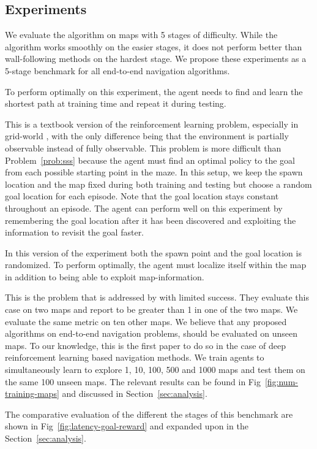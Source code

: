 \subsection{Experiments}
\label{sec:navtasks}
We evaluate the \NavAiiiCDiDiiL{} algorithm on maps with 5 stages of difficulty. While the algorithm works smoothly on the easier stages, it does not perform better than wall-following  methods on the hardest stage.
We propose these experiments as a 5-stage benchmark for all end-to-end navigation algorithms.

\begin{description}
  \label{prob:sss}
  To perform optimally on this experiment, the agent needs to find and learn the shortest path at training time and repeat it during testing. 

  This is a textbook version of the reinforcement learning problem, especially in grid-world \cite{SuBaBOOK1998}, with the only difference being that the environment is partially observable instead of fully observable.
  This problem is more difficult than Problem~\ref{prob:sss} because the agent
  must find an optimal policy to the goal from each possible starting point in the maze.
  In this setup, we keep the spawn location and the map fixed during both training and testing but choose a random goal location for each episode.
  Note that the goal location stays constant throughout an episode.
  The agent can perform well on this experiment by remembering the goal location after it has been discovered and exploiting the information to revisit the goal faster.  
  
  In this version of the experiment both the spawn point and the goal location is randomized. To perform optimally, the agent must localize itself within the map in addition to being able to exploit map-information.
  
  This is the problem that is addressed by \cite{MiPaViICLR2017} with limited success. 
  They evaluate this case on two maps and report \LatencyOneGtOne{} to be greater than 1 in one of the two maps. We evaluate the same metric on ten other maps.
    We believe that any proposed algorithms on end-to-end navigation problems, should be evaluated on unseen maps.
    To our knowledge, this is the first paper to do so in the case of deep reinforcement learning based navigation methods.
    We train agents to simultaneously learn to explore 1, 10, 100, 500 and 1000 maps and test them on the same 100 unseen maps. The relevant results can be found in Fig~\ref{fig:num-training-maps} and discussed in Section~\ref{sec:analysis}. 
\end{description}

The comparative evaluation of the different the stages of this benchmark are shown in Fig~\ref{fig:latency-goal-reward} and expanded upon in the Section~\ref{sec:analysis}.



